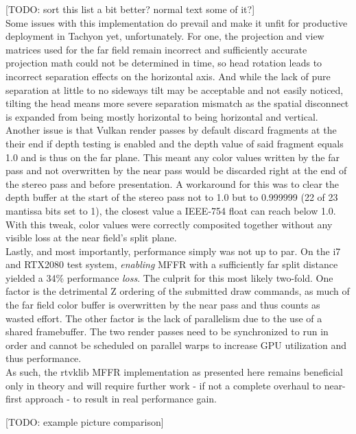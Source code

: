 [TODO: sort this list a bit better? normal text some of it?] \\

Some issues with this implementation do prevail and make it unfit for productive deployment in Tachyon yet, unfortunately. 
For one, the projection and view matrices used for the far field remain incorrect and sufficiently accurate projection math could not be determined in time, so head rotation leads to incorrect separation effects on the horizontal axis. And while the lack of pure separation at little to no sideways tilt may be acceptable and not easily noticed, tilting the head means more severe separation mismatch as the spatial disconnect is expanded from being mostly horizontal to being horizontal and vertical. \\
Another issue is that Vulkan render passes by default discard fragments at the their end if depth testing is enabled and the depth value of said fragment equals 1.0 and is thus on the far plane. This meant any color values written by the far pass and not overwritten by the near pass would be discarded right at the end of the stereo pass and before presentation. A workaround for this was to clear the depth buffer at the start of the stereo pass not to 1.0 but to 0.999999 (22 of 23 mantissa bits set to 1), the closest value a IEEE-754 float can reach below 1.0. With this tweak, color values were correctly composited together without any visible loss at the near field's split plane. \\
Lastly, and most importantly, performance simply was not up to par. On the i7 and RTX2080 test system, \textit{enabling} MFFR with a sufficiently far split distance yielded a 34\% performance \textit{loss}. The culprit for this most likely two-fold. One factor is the detrimental Z ordering of the submitted draw commands, as much of the far field color buffer is overwritten by the near pass and thus counts as wasted effort. The other factor is the lack of parallelism due to the use of a shared framebuffer. The two render passes need to be synchronized to run in order and cannot be scheduled on parallel warps to increase GPU utilization and thus performance. \\
As such, the rtvklib MFFR implementation as presented here remains beneficial only in theory and will require further work - if not a complete overhaul to near-first approach - to result in real performance gain. 

[TODO: example picture comparison]



